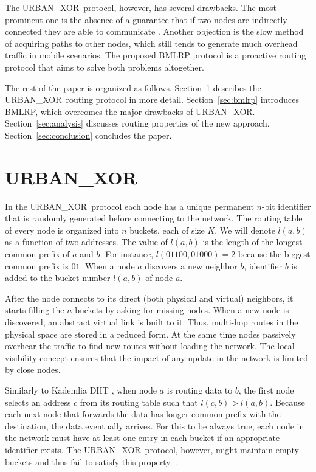 \documentclass[conference]{IEEEtran}
\theoremstyle{definition}
\newcommand{\urbanxor}{URBAN\_XOR}
\begin{document}
The \urbanxor\ protocol, however, has several drawbacks. The most prominent one is the absence of a guarantee that if two nodes are indirectly connected they are able to communicate \cite{Pasquini}. Another objection is the slow method of acquiring paths to other nodes, which still tends to generate much overhead traffic in mobile scenarios. The proposed BMLRP protocol is a proactive routing protocol that aims to solve both problems altogether.

The rest of the paper is organized as follows. Section~\ref{sec:urbanxor} describes the \urbanxor\ routing protocol in more detail. Section~\ref{sec:bmlrp} introduces BMLRP, which overcomes the major drawbacks of \urbanxor. 
Section~\ref{sec:analysis} discusses routing properties of the new approach. 
Section~\ref{sec:conclusion} concludes the paper.


\section{\urbanxor}
\label{sec:urbanxor}

In the \urbanxor\ protocol each node has a unique permanent $n$-bit identifier that is randomly generated before connecting to the network. The routing table of every node is organized into $n$ buckets, each of size $K$. We will denote $l(a,b)$ as a function of two addresses. The value of $l(a,b)$ is the length of the longest common prefix of $a$ and $b$. For instance, $l(01100, 01000) = 2$ because the biggest common prefix is $01$. When a node $a$ discovers a new neighbor $b$, identifier $b$ is added to the bucket number $l(a,b)$ of node $a$.

After the node connects to its direct (both physical and virtual) neighbors, it starts filling the $n$ buckets by asking for missing nodes. When a new node is discovered, an abstract virtual link is built to it. Thus, multi-hop routes in the physical space are stored in a reduced form. At the same time nodes passively overhear the traffic to find new routes without loading the network. The local visibility concept ensures that the impact of any update in the network is limited by close nodes.

Similarly to Kademlia DHT \cite{kademlia}, when node $a$ is routing data to $b$, the first node selects an address $c$ from its routing table such that $l(c,b) > l(a,b)$. Because each next node that forwards the data has longer common prefix with the destination, the data eventually arrives. For this to be always true, each node in the network must have at least one entry in each bucket if an appropriate identifier exists. The \urbanxor\ protocol, however, might maintain empty buckets and thus fail to satisfy this property~\cite{Pasquini}.
\end{document}
